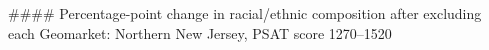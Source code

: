 #### Percentage-point change in racial/ethnic composition after excluding each Geomarket: Northern New Jersey, PSAT score 1270–1520
